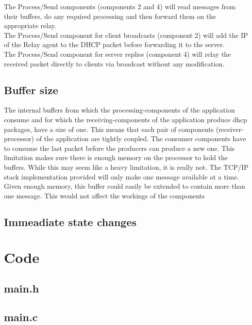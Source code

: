 \documentclass[11pt,a4paper]{scrartcl}
\begin{document}
The Process/Send components (components 2 and 4) will read messages from their buffers, do any required processing and then forward them on the appropriate relay.\\
The Process/Send component for client broadcasts (component 2) will add the IP of the Relay agent to the DHCP packet before forwarding it to the server.\\
The Process/Send component for server replies (component 4) will relay the received packet directly to clients via broadcast without any modification.

\subsection{Buffer size}
The internal buffers from which the processing-components of the application consume and for which the receiving-components of the application produce dhcp packages, have a size of one. This means that each pair of components (receiver-processor) of the application are tightly coupled. The consumer components have to consume the last packet before the producers can produce a new one. This limitation makes sure there is enough memory on the processor to hold the buffers. While this may seem like a heavy limitation, it is really not. The TCP/IP stack implementation provided will only make one message available at a time.\\
Given enough memory, this buffer could easily be extended to contain more than one message. This would not affect the workings of the components 

\subsection{Immeadiate state changes}

\newpage

\appendix
\section{Code}

\subsection{main.h}


\subsection{main.c}

\end{document}
